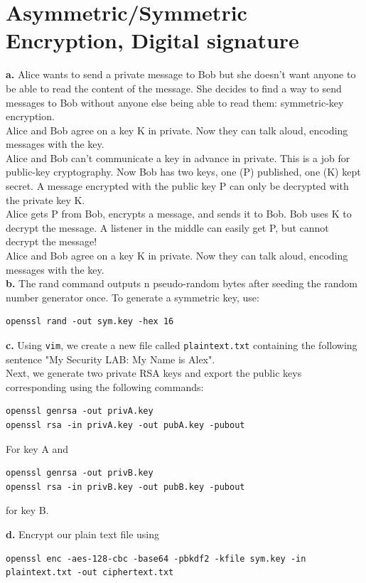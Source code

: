 \documentclass[12pt]{extarticle}
\begin{document}
\section{Asymmetric/Symmetric Encryption, Digital signature}
\textbf{a.} Alice wants to send a private message to Bob but she doesn't want anyone to be able to read the content of the message. She decides to find a way to send messages to Bob without anyone else being able to read them: symmetric-key encryption.\\
Alice and Bob agree on a key K in private. Now they can talk aloud, encoding messages with the key.\\
Alice and Bob can't communicate a key in advance in private. This is a job for public-key cryptography. Now Bob has two keys, one (P) published, one (K) kept secret. A message encrypted with the public key P can only be decrypted with the private key K.\\
Alice gets P from Bob, encrypts a message, and sends it to Bob. Bob uses K to decrypt the message.
A listener in the middle can easily get P, but cannot decrypt the message!\\
Alice and Bob agree on a key K in private. Now they can talk aloud, encoding messages with the key.\\

\textbf{b.} The rand command outputs n pseudo-random bytes after seeding the random number generator once. To generate a symmetric key, use:
\begin{verbatim}
openssl rand -out sym.key -hex 16
\end{verbatim}

\textbf{c.} Using \texttt{vim}, we create a new file called \texttt{plaintext.txt} containing the following sentence "My Security LAB: My Name is Alex".\\
Next, we generate two private RSA keys and export the public keys corresponding using the following commands:
\begin{verbatim}
openssl genrsa -out privA.key
openssl rsa -in privA.key -out pubA.key -pubout
\end{verbatim}
For key A and
\begin{verbatim}
openssl genrsa -out privB.key
openssl rsa -in privB.key -out pubB.key -pubout
\end{verbatim}
for key B.

\textbf{d.} Encrypt our plain text file using
\begin{verbatim}
openssl enc -aes-128-cbc -base64 -pbkdf2 -kfile sym.key -in plaintext.txt -out ciphertext.txt
\end{verbatim}
\end{document}
